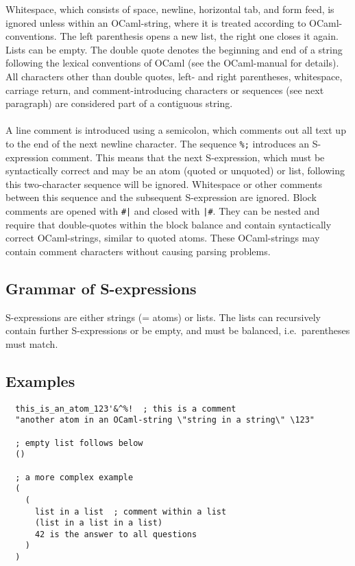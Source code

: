\documentclass[a4paper]{article}
\begin{document}
Whitespace, which consists of space, newline, horizontal tab, and form feed,
is ignored unless within an OCaml-string, where it is treated according to
OCaml-conventions.  The left parenthesis opens a new list, the right one closes
it again.  Lists can be empty.  The double quote denotes the beginning and end
of a string following the lexical conventions of OCaml (see the OCaml-manual
for details).  All characters other than double quotes, left- and right
parentheses, whitespace, carriage return, and comment-introducing characters
or sequences (see next paragraph) are considered part of a contiguous string.\\
\\
A line comment is introduced using a semicolon, which comments out all
text up to the end of the next newline character.  The sequence \verb=%;=
introduces an S-expression comment.  This means that the next S-expression,
which must be syntactically correct and may be an atom (quoted or unquoted)
or list, following this two-character sequence will be ignored.  Whitespace
or other comments between this sequence and the subsequent S-expression are
ignored.  Block comments are opened with \verb=#|= and closed with \verb=|#=.
They can be nested and require that double-quotes within the block balance
and contain syntactically correct OCaml-strings, similar to quoted atoms.
These OCaml-strings may contain comment characters without causing parsing
problems.

\subsection{Grammar of S-expressions}

S-expressions are either strings (= atoms) or lists. The lists can
recursively contain further S-expressions or be empty, and must be
balanced, i.e.\ parentheses must match.

\subsection{Examples}

{\samepage
\begin{verbatim}
  this_is_an_atom_123'&^%!  ; this is a comment
  "another atom in an OCaml-string \"string in a string\" \123"

  ; empty list follows below
  ()

  ; a more complex example
  (
    (
      list in a list  ; comment within a list
      (list in a list in a list)
      42 is the answer to all questions
    )
  )
\end{verbatim}
}
\end{document}
